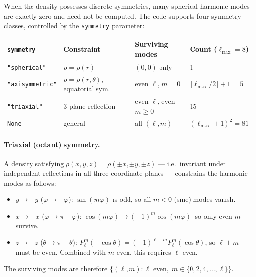 \documentclass[11pt]{article}
\begin{document}
When the density possesses discrete symmetries, many spherical harmonic
modes are exactly zero and need not be computed.  The code supports four
symmetry classes, controlled by the \texttt{symmetry} parameter:

\begin{center}
\begin{tabular}{llll}
\toprule
\texttt{symmetry} & Constraint & Surviving modes & Count ($\ell_{\max}{=}8$) \\
\midrule
\texttt{"spherical"} & $\rho = \rho(r)$ & $(0,0)$ only & 1 \\
\texttt{"axisymmetric"} & $\rho = \rho(r,\theta)$, equatorial sym. & even $\ell$, $m=0$ & $\lfloor\ell_{\max}/2\rfloor+1 = 5$ \\
\texttt{"triaxial"} & 3-plane reflection & even $\ell$, even $m \ge 0$ & 15 \\
\texttt{None} & general & all $(\ell,m)$ & $(\ell_{\max}+1)^2 = 81$ \\
\bottomrule
\end{tabular}
\end{center}

\paragraph{Triaxial (octant) symmetry.}
A density satisfying $\rho(x,y,z) = \rho(\pm x, \pm y, \pm z)$ — i.e.\
invariant under independent reflections in all three coordinate planes —
constrains the harmonic modes as follows:
\begin{itemize}
  \item $y \to -y$ ($\varphi \to -\varphi$): $\sin(m\varphi)$ is odd, so all
        $m < 0$ (sine) modes vanish.
  \item $x \to -x$ ($\varphi \to \pi - \varphi$): $\cos(m\varphi) \to
        (-1)^m \cos(m\varphi)$, so only even $m$ survive.
  \item $z \to -z$ ($\theta \to \pi - \theta$): $P_\ell^m(-\cos\theta) =
        (-1)^{\ell+m} P_\ell^m(\cos\theta)$, so $\ell + m$ must be even.
        Combined with $m$ even, this requires $\ell$ even.
\end{itemize}
The surviving modes are therefore $\{(\ell, m) : \ell \text{ even},\;
m \in \{0, 2, 4, \ldots, \ell\}\}$.
\end{document}
